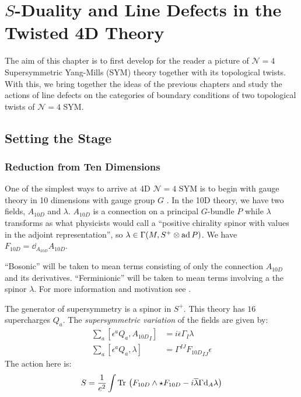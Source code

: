 \chapter{$S$-Duality and Line Defects in the Twisted 4D Theory\label{ch:finale}}

The aim of this chapter is to first develop for the reader a picture of $\mathcal N = 4$ Supersymmetric Yang-Mills (SYM) theory together with its topological twists. With this, we bring together the ideas of the previous chapters and study the actions of line defects on the categories of boundary conditions of two topological twists of $\mathcal N=4$ SYM.

\section{Setting the Stage} %
\label{sec:setting_the_stage}

\subsection{Reduction from Ten Dimensions} %
\label{sub:reduction_from_ten_dimensions}

One of the simplest ways to arrive at 4D $\mathcal N=4$ SYM is to begin with gauge theory in 10 dimensions with gauge group $G$ \cite{kapustin2006}. In the 10D theory, we have two fields, $A_{10D}$ and $\lambda$. $A_{10D}$ is a connection on a principal $G$-bundle $P$ while $\lambda$ transforms as what physicists would call a ``positive chirality spinor with values in the adjoint representation'', so $\lambda \in \Gamma(M, S^+ \otimes \mathrm{ad}\, P)$. We have $F_{10D} = \dd_{A_{10D}} A_{10D}$.

``Bosonic'' will be taken to mean terms consisting of only the connection $A_{10D}$ and its derivatives. ``Ferminionic'' will be taken to mean terms involving a the spinor $\lambda$. For more information and motivation see \cite{schwartz2014}.

The generator of supersymmetry is a spinor in $S^+$. This theory has $16$ supercharges $Q_a$. The \emph{supersymmetric variation} of the fields are given by:
\[
\begin{aligned}
	\sum_a [\epsilon^a Q_a, {A_{10D}}_I] &= i \overline \epsilon \Gamma_I \lambda\\
	\sum_a [\epsilon^a Q_a, \lambda] &= \Gamma^{IJ} {F_{10D}}_{IJ} \epsilon
\end{aligned}	
\]
The action here is:
\begin{equation}
	S = \frac{1}{e^2} \int \mathrm{Tr}\, \left(F_{10D} \wedge \star F_{10D} - i \overline \lambda \Gamma \mathrm{d}_A \lambda \right) 
\end{equation}

